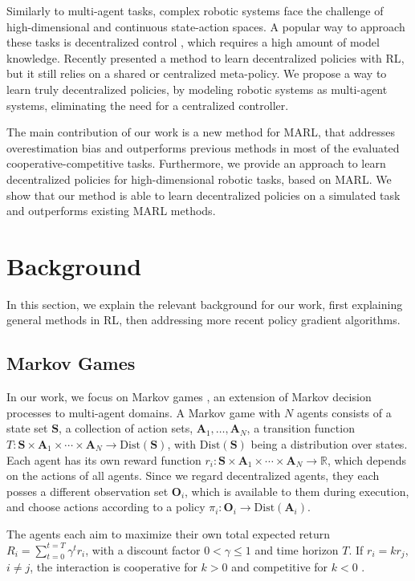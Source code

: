 \documentclass{article}
\newcommand{\set}[1]{\boldsymbol{#1}}
\newcommand{\policy}{\pi}
\newcommand{\reward}{r}
\newcommand{\stateSet}{\set{S}}
\newcommand{\actionSet}{\set{A}}
\newcommand{\observationSet}{\set{O}}
\newcommand{\realnum}{\mathbb{R}}
\newcommand{\transfun}{T}
\begin{document}
Similarly to multi-agent tasks, complex robotic systems face the challenge of high-dimensional and continuous state-action spaces. 
A popular way to approach these tasks is decentralized control \cite{Ijspeert2008}, which requires a high amount of model knowledge.
Recently \cite{Sartoretti2018} presented a method to learn decentralized policies with \gls*{RL}, but it still relies on a shared or centralized meta-policy.
We propose a way to learn truly decentralized policies, by modeling robotic systems as multi-agent systems, eliminating the need for a centralized controller.

The main contribution of our work is a new method for \gls*{MARL}, that addresses overestimation bias and outperforms previous methods in most of the evaluated cooperative-competitive tasks.
Furthermore, we provide an approach to learn decentralized policies for high-dimensional robotic tasks, based on \gls*{MARL}.
We show that our method is able to learn decentralized policies on a simulated task and outperforms existing \gls*{MARL} methods.

\section{Background}
In this section, we explain the relevant background for our work, first explaining general methods in \gls*{RL}, then addressing more recent policy gradient algorithms.
\subsection{Markov Games}
In our work, we focus on Markov games \cite{Littman1994}, an extension of Markov decision processes to multi-agent domains.
A Markov game with $N$ agents consists of a state set $\stateSet$, a collection of action sets, $\actionSet_1,\ldots,\actionSet_N$, a transition function $\transfun : \stateSet \times \actionSet_1 \times \cdots \times \actionSet_N \to \mathrm{Dist}(\stateSet)$, with $\mathrm{Dist}(\stateSet)$ being a distribution over states.
Each agent has its own reward function $\reward_i : \stateSet \times \actionSet_1 \times \cdots \times \actionSet_N \to \realnum$, which depends on the actions of all agents.
Since we regard decentralized agents, they each posses a different observation set $\observationSet_i$, which is available to them during execution, and choose actions according to a policy $\policy_i : \observationSet_i \to \mathrm{Dist}(\actionSet_i)$.

The agents each aim to maximize their own total expected return $R_i = \sum_{t=0}^{t=T} \gamma^t r_i$, with a discount factor $0<\gamma\le1$ and time horizon $T$.
If $\reward_i =  k \reward_j$, $i\neq j$, the interaction is cooperative for $k>0$ and competitive for $k<0$	.
\end{document}
